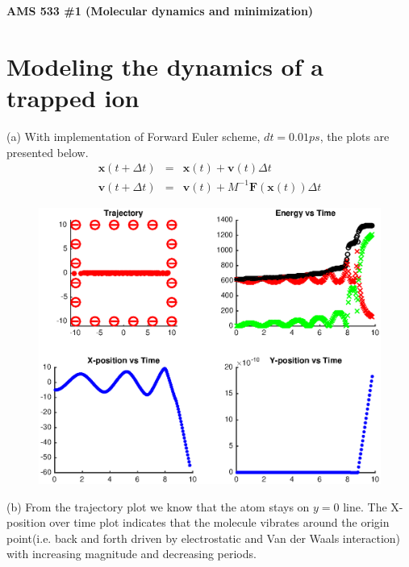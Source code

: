 \documentclass{article}
\begin{document}
\fancyhf{}
\fancyhead[R]{$\cdot$ \thepage $\cdot$}

\begin{center}
{\Large\bf AMS 533 \#1 (Molecular dynamics and minimization)}
\end{center}

\section{Modeling the dynamics of a trapped ion}
(a) With implementation of Forward Euler scheme, $dt=0.01ps$, the plots are presented below.
\begin{eqnarray*}
\mathbf{x}(t+\Delta t) &=& \mathbf{x}(t) + \mathbf{v}(t)\Delta t\\
\mathbf{v}(t+\Delta t) &=& \mathbf{v}(t) + M^{-1}\mathbf{F}(\mathbf{x}(t))\Delta t
\end{eqnarray*}

\begin{figure}[h]
    \centering
    \includegraphics[scale=0.76]{1.eps}
  \end{figure}

\noindent
(b) From the trajectory plot we know that the atom stays on $y=0$ line. The X-position over time plot indicates that the molecule vibrates around the origin point(i.e. back and forth driven by electrostatic and Van der Waals interaction) with increasing magnitude and decreasing periods. 

\vspace{5mm}
\end{document}
